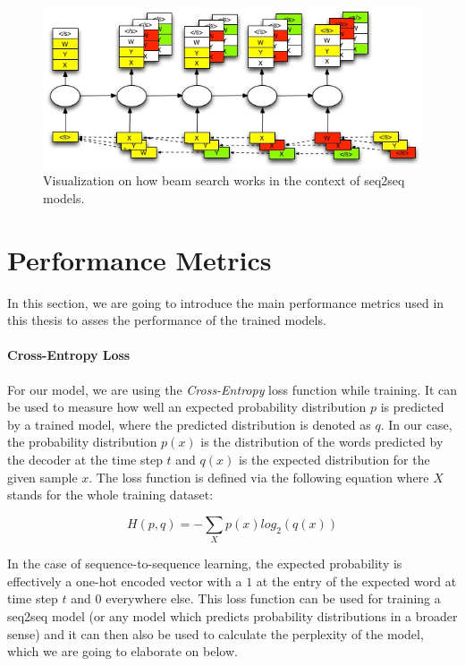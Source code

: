 \begin{figure}[h]
	\label{fundamentals:seq2seq:beam_search}
	\centering
	\includegraphics[width=12cm]{img/beam_search_visualization}
	\caption{Visualization on how beam search works in the context of seq2seq models.\protect\footnotemark}
\end{figure}

\section{Performance Metrics}
In this section, we are going to introduce the main performance metrics used in this thesis to asses the performance of the trained models.

\paragraph{Cross-Entropy Loss} For our model, we are using the \emph{Cross-Entropy} loss function while training. It can be used to measure how well an expected probability distribution $p$ is predicted by a trained model, where the predicted distribution is denoted as $q$. In our case, the probability distribution $p(x)$ is the distribution of the words predicted by the decoder at the time step $t$ and $q(x)$ is the expected distribution for the given sample $x$. The loss function is defined via the following equation where $X$ stands for the whole training dataset:

\begin{equation}
H(p, q) = - \sum_{X} p(x) log_2(q(x))
\end{equation}

In the case of sequence-to-sequence learning, the expected probability is effectively a one-hot encoded vector with a $1$ at the entry of the expected word at time step $t$ and $0$ everywhere else. This loss function can be used for training a seq2seq model (or any model which predicts probability distributions in a broader sense) and it can then also be used to calculate the perplexity of the model, which we are going to elaborate on below.

